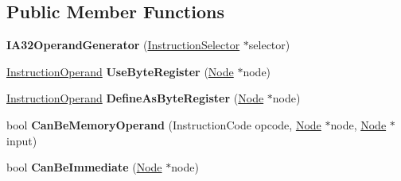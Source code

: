 \subsection*{Public Member Functions}
\begin{DoxyCompactItemize}
\item 
{\bfseries I\+A32\+Operand\+Generator} (\hyperlink{classv8_1_1internal_1_1compiler_1_1_instruction_selector}{Instruction\+Selector} $\ast$selector)\hypertarget{classv8_1_1internal_1_1compiler_1_1_i_a32_operand_generator_a6fff7bcfa121c5543bf9b7604e252076}{}\label{classv8_1_1internal_1_1compiler_1_1_i_a32_operand_generator_a6fff7bcfa121c5543bf9b7604e252076}

\item 
\hyperlink{classv8_1_1internal_1_1compiler_1_1_instruction_operand}{Instruction\+Operand} {\bfseries Use\+Byte\+Register} (\hyperlink{classv8_1_1internal_1_1compiler_1_1_node}{Node} $\ast$node)\hypertarget{classv8_1_1internal_1_1compiler_1_1_i_a32_operand_generator_a8ac51b97395c248148a7b4edbc904301}{}\label{classv8_1_1internal_1_1compiler_1_1_i_a32_operand_generator_a8ac51b97395c248148a7b4edbc904301}

\item 
\hyperlink{classv8_1_1internal_1_1compiler_1_1_instruction_operand}{Instruction\+Operand} {\bfseries Define\+As\+Byte\+Register} (\hyperlink{classv8_1_1internal_1_1compiler_1_1_node}{Node} $\ast$node)\hypertarget{classv8_1_1internal_1_1compiler_1_1_i_a32_operand_generator_aad6f1c6d7915b721399695edd9e84db1}{}\label{classv8_1_1internal_1_1compiler_1_1_i_a32_operand_generator_aad6f1c6d7915b721399695edd9e84db1}

\item 
bool {\bfseries Can\+Be\+Memory\+Operand} (Instruction\+Code opcode, \hyperlink{classv8_1_1internal_1_1compiler_1_1_node}{Node} $\ast$node, \hyperlink{classv8_1_1internal_1_1compiler_1_1_node}{Node} $\ast$input)\hypertarget{classv8_1_1internal_1_1compiler_1_1_i_a32_operand_generator_a145d2adb961f78b9ca8e900e42243c93}{}\label{classv8_1_1internal_1_1compiler_1_1_i_a32_operand_generator_a145d2adb961f78b9ca8e900e42243c93}

\item 
bool {\bfseries Can\+Be\+Immediate} (\hyperlink{classv8_1_1internal_1_1compiler_1_1_node}{Node} $\ast$node)\hypertarget{classv8_1_1internal_1_1compiler_1_1_i_a32_operand_generator_a55efece469da2ec5e39f1ab2fb8aecf1}{}\label{classv8_1_1internal_1_1compiler_1_1_i_a32_operand_generator_a55efece469da2ec5e39f1ab2fb8aecf1}


\end{DoxyCompactItemize}

